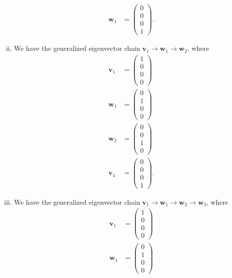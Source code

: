 \documentclass[10pt]{mypackage}
\begin{document}
\begin{solution}
\begin{enumerate}[(i)]
\begin{align*}
        \mathbf{w}_1 &= \begin{pmatrix}0\\0\\0\\1\end{pmatrix}.
      \end{align*}
    \item We have the generalized eigenvector chain $\mathbf{v}_1 \rightarrow \mathbf{w}_1\rightarrow \mathbf{w}_2$, where
      \begin{align*}
        \mathbf{v}_1 &= \begin{pmatrix}1\\0\\0\\0\end{pmatrix}\\
        \mathbf{w}_1 &= \begin{pmatrix}0\\1\\0\\0\end{pmatrix}\\
        \mathbf{w}_2 &= \begin{pmatrix}0\\0\\1\\0\end{pmatrix}\\
        \mathbf{v}_4 &= \begin{pmatrix}0\\0\\0\\1\end{pmatrix}.
      \end{align*}
    \item We have the generalized eigenvector chain $\mathbf{v}_1 \rightarrow \mathbf{w}_1 \rightarrow \mathbf{w}_2 \rightarrow \mathbf{w}_3$, where
      \begin{align*}
        \mathbf{v}_1 &= \begin{pmatrix}1\\0\\0\\0\end{pmatrix}\\
        \mathbf{w}_1 &= \begin{pmatrix}0\\1\\0\\0\end{pmatrix}\\

\end{align*}
\end{enumerate}
\end{solution}
\end{document}
